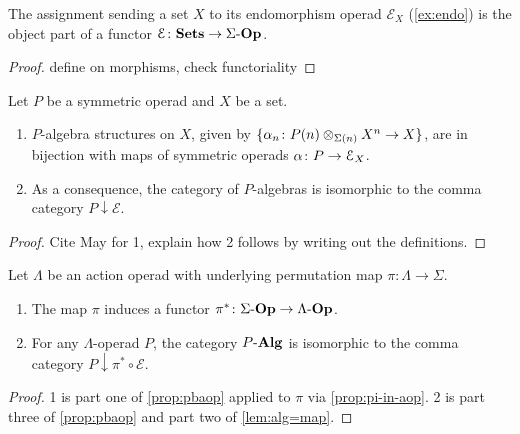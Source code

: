 \begin{prop}\label{prop:e-fun}
The assignment sending a set $X$ to its endomorphism operad $\mathcal{E}_X$ (\cref{ex:endo}) is the object part of a functor $\mathcal{E} \colon \mathbf{Sets} \to \Sigma\mbox{-}\mathbf{Op}$.
\end{prop}
\begin{proof}
define on morphisms, check functoriality
\end{proof}

\begin{lem}\label{lem:alg=map}
 Let $P$ be a symmetric operad and $X$ be a set.
\begin{enumerate}
\item $P$-algebra structures on $X$, given by $\{ \alpha_n \colon  P(n) \otimes_{\Sigma(n)} X^{n} \rightarrow X\}$, are in bijection with maps of symmetric operads $\alpha \colon P \to \mathcal{E}_X$.
\item As a consequence, the category of $P$-algebras is isomorphic to the comma category $P \downarrow \mathcal{E}$.
\end{enumerate}
\end{lem}
\begin{proof}
Cite May for 1, explain how 2 follows by writing out the definitions.
\end{proof}

\begin{cor}\label{cor:pi-star}
Let $\Lambda$ be an action operad with underlying permutation map $\pi \colon \Lambda \to \Sigma$. 
\begin{enumerate}
\item The map $\pi$ induces a functor $\pi^* \colon \Sigma\mbox{-}\mathbf{Op} \to \Lambda\mbox{-}\mathbf{Op}$.
\item For any $\Lambda$-operad $P$, the category $P\mbox{-}\mathbf{Alg}$ is isomorphic to the comma category $P \downarrow \pi^* \circ \mathcal{E}$.
\end{enumerate}
\end{cor}
\begin{proof}
1 is part one of \cref{prop:pbaop} applied to $\pi$ via \cref{prop:pi-in-aop}.
2 is part three of \cref{prop:pbaop} and part two of \cref{lem:alg=map}.
\end{proof}

